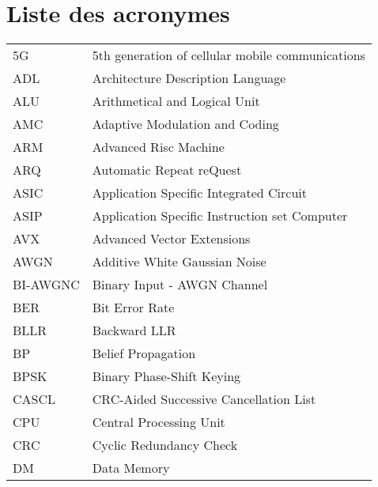 \chapter*{Liste des acronymes}
\begin{center}

\begin{longtable}{ p{}  p{} } 

5G        & 5th generation of cellular mobile communications       \\
ADL       & Architecture Description Language                      \\
ALU       & Arithmetical and Logical Unit                          \\
AMC       & Adaptive Modulation and Coding                         \\
ARM       & Advanced Risc Machine                                  \\
ARQ       & Automatic Repeat reQuest                               \\
ASIC      & Application Specific Integrated Circuit                \\
ASIP      & Application Specific Instruction set Computer          \\
AVX       & Advanced Vector Extensions                             \\
AWGN      & Additive White Gaussian Noise                          \\
BI-AWGNC  & Binary Input - AWGN Channel                            \\
BER       & Bit Error Rate                                         \\
BLLR      & Backward LLR                                           \\
BP        & Belief Propagation                                     \\
BPSK      & Binary Phase-Shift Keying                              \\
CASCL     & CRC-Aided Successive Cancellation List                 \\
CPU       & Central Processing Unit                                \\
CRC       & Cyclic Redundancy Check                                \\
DM        & Data Memory                                            \\

\end{longtable}
\end{center}

